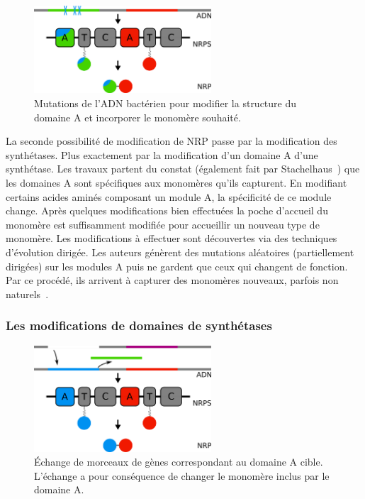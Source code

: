 \begin{figure}[h!]
  \begin{center}
    \includegraphics[width=250px]{Figures/synthese/mutations.png}
    \caption{\label{mutation}Mutations de l'ADN bactérien pour modifier la structure du domaine A et incorporer le monomère souhaité.}
  \end{center}
\end{figure}

La seconde possibilité de modification de NRP passe par la modification des synthétases.
Plus exactement par la modification d'un domaine A d'une synthétase.
Les travaux \cite{villiers_mapping_2009, kries_reprogramming_2014, williams_engineering_2013} partent du constat (également fait par Stachelhaus~\cite{stachelhaus_specificity-conferring_1999}) que les domaines A sont spécifiques aux monomères qu'ils capturent.
En modifiant certains acides aminés composant un module A, la spécificité de ce module change.
Après quelques modifications bien effectuées la poche d'accueil du monomère est suffisamment modifiée pour accueillir un nouveau type de monomère.
Les modifications à effectuer sont découvertes via des techniques d'évolution dirigée.
Les auteurs génèrent des mutations aléatoires (partiellement dirigées) sur les modules A puis ne gardent que ceux qui changent de fonction.
Par ce procédé, ils arrivent à capturer des monomères nouveaux, parfois non naturels~\cite{thirlway_introduction_2012}.



\subsubsection{Les modifications de domaines de synthétases}

\begin{figure}[h!]
  \begin{center}
    \includegraphics[width=250px]{Figures/synthese/echange.png}
    \caption{\label{echange}Échange de morceaux de gènes correspondant au domaine A cible.
    L'échange a pour conséquence de changer le monomère inclus par le domaine A.}
  \end{center}
\end{figure}

